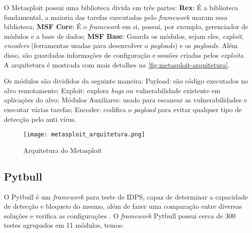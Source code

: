  O Metasploit possui uma biblioteca divida em três partes: \textbf{Rex}: É a biblioteca fundamental, a maioria das tarefas executadas pelo \textit{framework} usaram essa biblioteca; \textbf{MSF Core}: É o \textit{framework} em si, possui, por exemplo, gerenciador de módulos e a base de dados; \textbf{MSF Base}: Guarda os módulos, sejam eles, \textit{exploit}, \textit{encoders} (ferramentas usadas para desenvolver o \textit{payloads}) e os \textit{payloads}. Além disso, são guardadas informações de configuração e sessões criadas pelos \textit{exploits}. A arquitetura é mostrada com mais detalhes na \autoref{fig:metasploit-arquitetura}. 

 Os módulos são divididos da seguinte maneira: Payload: são código executados no alvo remotamente; Exploit: explora \textit{bugs} ou vulnerabilidade existente em aplicações do alvo; Módulos Auxiliares: usado para escanear as vulnerabilidades e executar várias tarefas; Encoder: codifica o \textit{payload} para evitar qualquer tipo de detecção pelo anti vírus.

 \begin{figure}[!htb]
  \centering
  \caption{Arquitetura do Metasploit}
  \texttt{[image: metasploit\_arquitetura.png]}
  \label{fig:metasploit-arquitetura}
 \end{figure}

 \subsection{Pytbull} \label{sec:pytbull}

 O Pytbull é um \textit{framework} para teste de IDPS, capaz de determinar a capacidade de detecção e bloqueio do mesmo, além de fazer uma comparação entre diversas soluções e verifica as configurações \cite{pytbull}. O \textit{framework} Pytbull possui cerca de 300 testes agrupados em 11 módulos, temos:

